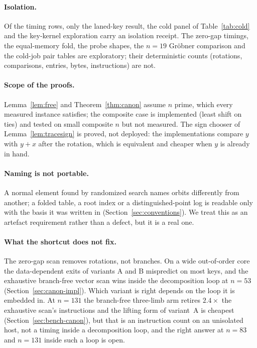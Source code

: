 \paragraph{Isolation.}
Of the timing rows, only the laned-key result, the cold panel of
Table~\ref{tab:cold} and the key-kernel exploration carry an
isolation receipt. The zero-gap timings, the equal-memory fold, the
probe shapes, the $n=19$ Gr\"obner comparison and the cold-job pair
tables are exploratory; their deterministic counts (rotations,
comparisons, entries, bytes, instructions) are not.

\paragraph{Scope of the proofs.}
Lemma~\ref{lem:free} and Theorem~\ref{thm:canon} assume $n$ prime, which
every measured instance satisfies; the composite case is implemented
(least shift on ties) and tested on small composite $n$ but not
measured. The sign chooser of Lemma~\ref{lem:tracesign} is proved, not
deployed: the implementations compare $y$ with $y+x$ after the
rotation, which is equivalent and cheaper when $y$ is already in hand.

\paragraph{Naming is not portable.}
A normal element found by randomized search names orbits differently
from another; a folded table, a root index or a distinguished-point
log is readable only with the basis it was written in
(Section~\ref{sec:conventions}). We treat this as an artefact
requirement rather than a defect, but it is a real one.

\paragraph{What the shortcut does not fix.}
The zero-gap scan removes rotations, not branches. On a wide
out-of-order core the data-dependent exits of variants A and B
mispredict on most keys, and the exhaustive branch-free vector scan
wins inside the decomposition loop at $n=53$
(Section~\ref{sec:canon-impl}). Which variant is right depends on the
loop it is embedded in. At $n=131$ the branch-free three-limb arm
retires $2.4\times$ the exhaustive scan's instructions and the lifting
form of variant~A is cheapest (Section~\ref{sec:bench-canon}), but
that is an instruction count on an unisolated host, not a timing
inside a decomposition loop, and the right answer at $n=83$ and
$n=131$ inside such a loop is open.
